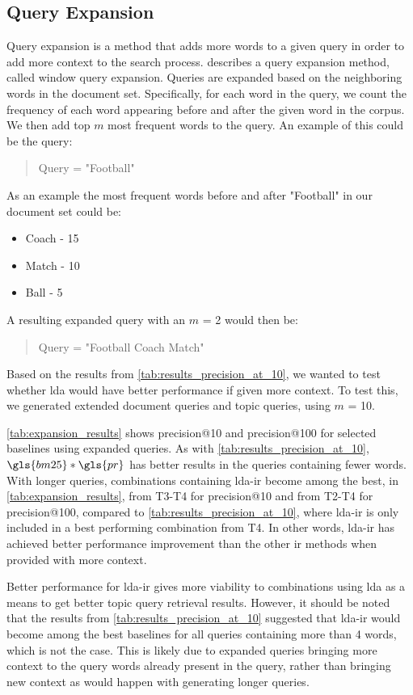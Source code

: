 \subsection{Query Expansion}\label{subsec:query_expansion}
Query expansion is a method that adds more words to a given query in order to add more context to the search process.
\citet{yang2009topic} describes a query expansion method, called window query expansion.
Queries are expanded based on the neighboring words in the document set.
Specifically, for each word in the query, we count the frequency of each word appearing before and after the given word in the corpus.
We then add top $m$ most frequent words to the query.
An example of this could be the query: 
\begin{quote}
	Query = "Football"
\end{quote}
As an example the most frequent words before and after "Football" in our document set could be:
\begin{itemize}
	\item Coach - 15
	\item Match - 10
	\item Ball - 5
\end{itemize}
A resulting expanded query with an $m$ = 2 would then be:
\begin{quote}
	Query = "Football Coach Match"
\end{quote}


Based on the results from \autoref{tab:results_precision_at_10}, we wanted to test whether \gls{lda} would have better performance if given more context.
To test this, we generated extended document queries and topic queries, using $m$ = 10.

\autoref{tab:expansion_results} shows precision@10 and precision@100 for selected baselines using expanded queries.
As with \autoref{tab:results_precision_at_10}, $\gls{bm25} * \gls{pr}$ has better results in the queries containing fewer words.
With longer queries, combinations containing \gls{lda}-\gls{ir} become among the best, in \autoref{tab:expansion_results}, from T3-T4 for precision@10 and from T2-T4 for precision@100, compared to \autoref{tab:results_precision_at_10}, where \gls{lda}-\gls{ir} is only included in a best performing combination from T4.
In other words, \gls{lda}-\gls{ir} has achieved better performance improvement than the other \gls{ir} methods when provided with more context.

Better performance for \gls{lda}-\gls{ir} gives more viability to combinations using \gls{lda} as a means to get better topic query retrieval results.
However, it should be noted that the results from \autoref{tab:results_precision_at_10} suggested that \gls{lda}-\gls{ir} would become among the best baselines for all queries containing more than 4 words, which is not the case.
This is likely due to expanded queries bringing more context to the query words already present in the query, rather than bringing new context as would happen with generating longer queries.

